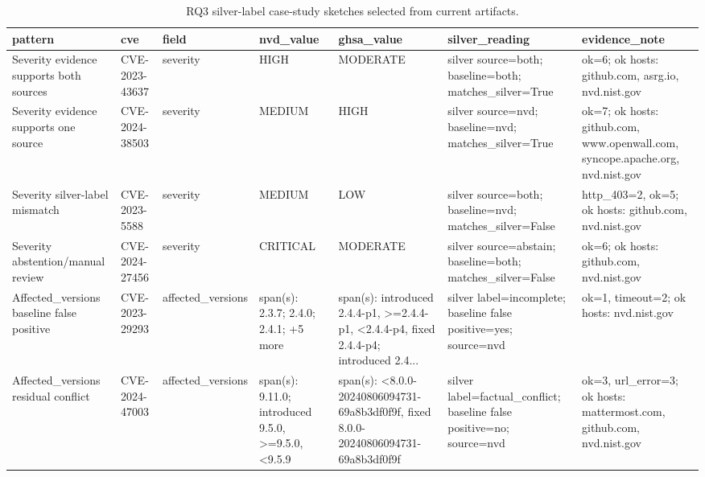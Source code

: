 \begin{table}[!htbp]
\centering
\setlength{\tabcolsep}{3pt}
\scriptsize
\caption{RQ3 silver-label case-study sketches selected from current artifacts.}
\label{tab:rq3-case-study-sketches}
\begin{tabularx}{\textwidth}{>{\raggedright\arraybackslash}p{}>{\raggedright\arraybackslash}X>{\raggedright\arraybackslash}X>{\raggedright\arraybackslash}X>{\raggedright\arraybackslash}X>{\raggedright\arraybackslash}X>{\raggedright\arraybackslash}X}
\toprule
pattern & cve & field & nvd\_value & ghsa\_value & silver\_reading & evidence\_note \\
\midrule
Severity evidence supports both sources & CVE-2023-43637 & severity & HIGH & MODERATE & silver source=both; baseline=both; matches\_silver=True & ok=6; ok hosts: github.com, asrg.io, nvd.nist.gov \\
Severity evidence supports one source & CVE-2024-38503 & severity & MEDIUM & HIGH & silver source=nvd; baseline=nvd; matches\_silver=True & ok=7; ok hosts: github.com, www.openwall.com, syncope.apache.org, nvd.nist.gov \\
Severity silver-label mismatch & CVE-2023-5588 & severity & MEDIUM & LOW & silver source=both; baseline=nvd; matches\_silver=False & http\_403=2, ok=5; ok hosts: github.com, nvd.nist.gov \\
Severity abstention/manual review & CVE-2024-27456 & severity & CRITICAL & MODERATE & silver source=abstain; baseline=both; matches\_silver=False & ok=6; ok hosts: github.com, nvd.nist.gov \\
Affected\_versions baseline false positive & CVE-2023-29293 & affected\_versions & 8 span(s): 2.3.7; 2.4.0; 2.4.1; +5 more & 2 span(s): introduced 2.4.4-p1, \textgreater{}=2.4.4-p1, \textless{}2.4.4-p4, fixed 2.4.4-p4; introduced 2.4... & silver label=incomplete; baseline false positive=yes; source=nvd & ok=1, timeout=2; ok hosts: nvd.nist.gov \\
Affected\_versions residual conflict & CVE-2024-47003 & affected\_versions & 2 span(s): 9.11.0; introduced 9.5.0, \textgreater{}=9.5.0, \textless{}9.5.9 & 1 span(s): \textless{}8.0.0-20240806094731-69a8b3df0f9f, fixed 8.0.0-20240806094731-69a8b3df0f9f & silver label=factual\_conflict; baseline false positive=no; source=nvd & ok=3, url\_error=3; ok hosts: mattermost.com, github.com, nvd.nist.gov \\
\bottomrule
\end{tabularx}
\end{table}
